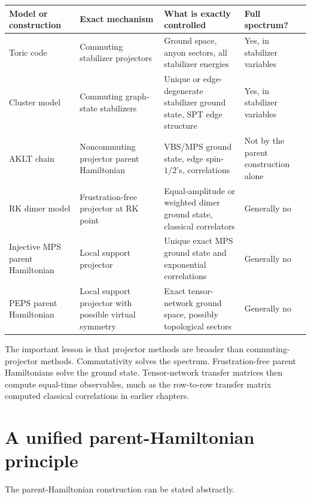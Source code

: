 \begin{center}
\begin{adjustbox}{max width=\textwidth}
\begin{tabular}{L{0.21\textwidth}L{0.25\textwidth}L{0.24\textwidth}L{0.22\textwidth}}
\toprule
Model or construction & Exact mechanism & What is exactly controlled & Full spectrum? \\
\midrule
Toric code & Commuting stabilizer projectors & Ground space, anyon sectors, all stabilizer energies & Yes, in stabilizer variables \\
Cluster model & Commuting graph-state stabilizers & Unique or edge-degenerate stabilizer ground state, SPT edge structure & Yes, in stabilizer variables \\
AKLT chain & Noncommuting projector parent Hamiltonian & VBS/MPS ground state, edge spin-
\(1/2\)'s, correlations & Not by the parent construction alone \\
RK dimer model & Frustration-free projector at RK point & Equal-amplitude or weighted dimer ground state, classical correlators & Generally no \\
Injective MPS parent Hamiltonian & Local support projector & Unique exact MPS ground state and exponential correlations & Generally no \\
PEPS parent Hamiltonian & Local support projector with possible virtual symmetry & Exact tensor-network ground space, possibly topological sectors & Generally no \\
\bottomrule
\end{tabular}
\end{adjustbox}
\end{center}

The important lesson is that projector methods are broader than commuting-
projector methods.  Commutativity solves the spectrum.  Frustration-free parent
Hamiltonians solve the ground state.  Tensor-network transfer matrices then
compute equal-time observables, much as the row-to-row transfer matrix computed
classical correlations in earlier chapters.

\section{A unified parent-Hamiltonian principle}
\label{sec:unified-parent-hamiltonian-principle}

The parent-Hamiltonian construction can be stated abstractly.

